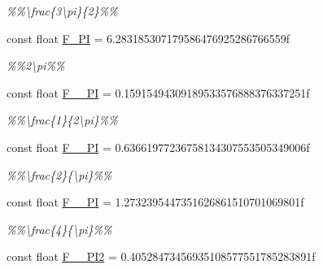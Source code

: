 \begin{DoxyCompactItemize}
\begin{DoxyCompactList}\small\item\em \%\%\textbackslash{}frac\{3\textbackslash{}pi\}\{2\}\%\% \end{DoxyCompactList}\item 
\hypertarget{group___scalar_math_consts_gac6cbd226e329cad09f1bab1504203fec}{}const float \hyperlink{group___scalar_math_consts_gac6cbd226e329cad09f1bab1504203fec}{F\+\_\+P\+I} = 6.\+283185307179586476925286766559f\label{group___scalar_math_consts_gac6cbd226e329cad09f1bab1504203fec}

\begin{DoxyCompactList}\small\item\em \%\%2\textbackslash{}pi\%\% \end{DoxyCompactList}\item 
\hypertarget{group___scalar_math_consts_ga325608134effda0b7b34f7088c419db0}{}const float \hyperlink{group___scalar_math_consts_ga325608134effda0b7b34f7088c419db0}{F\+\_\+\_\+P\+I} = 0.\+15915494309189533576888376337251f\label{group___scalar_math_consts_ga325608134effda0b7b34f7088c419db0}

\begin{DoxyCompactList}\small\item\em \%\%\textbackslash{}frac\{1\}\{2\textbackslash{}pi\}\%\% \end{DoxyCompactList}\item 
\hypertarget{group___scalar_math_consts_ga7d7b856fb17ca616495a547e582ca817}{}const float \hyperlink{group___scalar_math_consts_ga7d7b856fb17ca616495a547e582ca817}{F\+\_\+\_\+\+P\+I} = 0.\+63661977236758134307553505349006f\label{group___scalar_math_consts_ga7d7b856fb17ca616495a547e582ca817}

\begin{DoxyCompactList}\small\item\em \%\%\textbackslash{}frac\{2\}\{\textbackslash{}pi\}\%\% \end{DoxyCompactList}\item 
\hypertarget{group___scalar_math_consts_ga3cd60bb81423c63766d16736f113da50}{}const float \hyperlink{group___scalar_math_consts_ga3cd60bb81423c63766d16736f113da50}{F\+\_\+\_\+\+P\+I} = 1.\+2732395447351626861510701069801f\label{group___scalar_math_consts_ga3cd60bb81423c63766d16736f113da50}

\begin{DoxyCompactList}\small\item\em \%\%\textbackslash{}frac\{4\}\{\textbackslash{}pi\}\%\% \end{DoxyCompactList}\item 
\hypertarget{group___scalar_math_consts_ga0eddee00e29a22722352a3d22728d807}{}const float \hyperlink{group___scalar_math_consts_ga0eddee00e29a22722352a3d22728d807}{F\+\_\+\_\+\+P\+I2} = 0.\+40528473456935108577551785283891f\label{group___scalar_math_consts_ga0eddee00e29a22722352a3d22728d807}


\end{DoxyCompactItemize}
